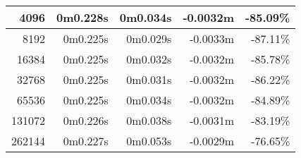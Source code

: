 \documentclass[documentation.tex]{subfiles}
\begin{document}
\begin{longtable}{|r|r|r|r|r|}
        4096                                                                                                                      & 0m0.228s                        & 0m0.034s                                                                       & {\color[HTML]{FF0000} -0.0032m}                       & {\color[HTML]{FF0000} -85.09\%}                        \\ \hline
        8192                                                                                                                      & 0m0.225s                        & 0m0.029s                                                                       & {\color[HTML]{FF0000} -0.0033m}                       & {\color[HTML]{FF0000} -87.11\%}                        \\ \hline
        16384                                                                                                                     & 0m0.225s                        & 0m0.032s                                                                       & {\color[HTML]{FF0000} -0.0032m}                       & {\color[HTML]{FF0000} -85.78\%}                        \\ \hline
        32768                                                                                                                     & 0m0.225s                        & 0m0.031s                                                                       & {\color[HTML]{FF0000} -0.0032m}                       & {\color[HTML]{FF0000} -86.22\%}                        \\ \hline
        65536                                                                                                                     & 0m0.225s                        & 0m0.034s                                                                       & {\color[HTML]{FF0000} -0.0032m}                       & {\color[HTML]{FF0000} -84.89\%}                        \\ \hline
        131072                                                                                                                    & 0m0.226s                        & 0m0.038s                                                                       & {\color[HTML]{FF0000} -0.0031m}                       & {\color[HTML]{FF0000} -83.19\%}                        \\ \hline
        262144                                                                                                                    & 0m0.227s                        & 0m0.053s                                                                       & {\color[HTML]{FF0000} -0.0029m}                       & {\color[HTML]{FF0000} -76.65\%}                        \\ \hline

\end{longtable}
\end{document}
